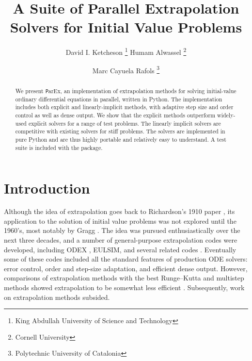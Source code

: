 \documentclass[12pt]{article}
\newcommand{\parex}{\texttt ParEx}
\begin{document}
\title{A Suite of Parallel Extrapolation Solvers for Initial Value Problems}
\author{David I. Ketcheson
\thanks{King Abdullah University of Science and Technology}
Humam Alwassel
\thanks{Cornell University} \and
Marc Cayuela Rafols
\thanks{Polytechnic University of Catalonia} \and
}

\maketitle

\begin{abstract}
We present \parex, an implementation of extrapolation 
methods for solving initial-value ordinary differential equations
in parallel, written in Python.
The implementation includes both explicit and  linearly-implicit methods, with
adaptive step size and order control as well as dense output.
We show that the 
explicit methods outperform widely-used explicit solvers for a 
range of test problems.
The linearly implicit solvers are competitive with existing solvers
for stiff problems.%
The solvers are
implemented in pure Python and are thus highly portable and 
relatively easy to understand.
A test suite is included with the package.
\end{abstract}




\section{Introduction}
Although the idea of extrapolation goes back to Richardson's
1910 paper \cite{richardson1910approximate},
its application to the solution of initial value problems
was not explored until the 1960's, most notably by Gragg \cite{gragg1965extrapolation}.
The idea was pursued enthusiastically over the next three
decades, and a number of general-purpose extrapolation codes
were developed, including ODEX \cite{HairerODEX}, EULSIM, and several related codes \cite{extrapolation_codes}.  
Eventually some of these codes included 
all the standard features of production ODE solvers:
error control, order and step-size adaptation, and 
efficient dense output.
However, comparisons of extrapolation methods with
the best Runge--Kutta and multistep methods showed 
extrapolation to be somewhat less efficient \cite{Shampine1986,hosea1994a}.
Subsequently, work on extrapolation methods subsided.
\end{document}

